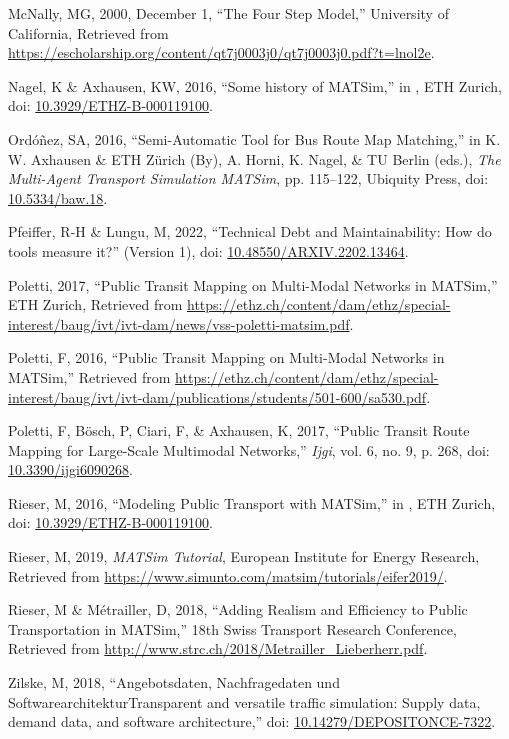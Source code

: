 \documentclass[11pt]{article}
\begin{document}
\begin{hangparas}{1.5em}{1}
\hypertarget{citeproc_bib_item_8}{McNally, MG, 2000, December 1, “The Four Step Model,” University of California, Retrieved from \url{https://escholarship.org/content/qt7j0003j0/qt7j0003j0.pdf?t=lnol2e}.}

\hypertarget{citeproc_bib_item_9}{Nagel, K \& Axhausen, KW, 2016, “Some history of MATSim,” in , ETH Zurich, doi: \href{https://doi.org/10.3929/ETHZ-B-000119100}{10.3929/ETHZ-B-000119100}.}

\hypertarget{citeproc_bib_item_10}{Ordóñez, SA, 2016, “Semi-Automatic Tool for Bus Route Map Matching,” in K. W. Axhausen \& ETH Zürich (By), A. Horni, K. Nagel, \& TU Berlin (eds.), \textit{The Multi-Agent Transport Simulation MATSim}, pp. 115–122, Ubiquity Press, doi: \href{https://doi.org/10.5334/baw.18}{10.5334/baw.18}.}

\hypertarget{citeproc_bib_item_11}{Pfeiffer, R-H \& Lungu, M, 2022, “Technical Debt and Maintainability: How do tools measure it?” (Version 1), doi: \href{https://doi.org/10.48550/ARXIV.2202.13464}{10.48550/ARXIV.2202.13464}.}

\hypertarget{citeproc_bib_item_12}{Poletti, 2017, “Public Transit Mapping on Multi-Modal Networks in MATSim,” ETH Zurich, Retrieved from \url{https://ethz.ch/content/dam/ethz/special-interest/baug/ivt/ivt-dam/news/vss-poletti-matsim.pdf}.}

\hypertarget{citeproc_bib_item_13}{Poletti, F, 2016, “Public Transit Mapping on Multi-Modal Networks in MATSim,” Retrieved from \url{https://ethz.ch/content/dam/ethz/special-interest/baug/ivt/ivt-dam/publications/students/501-600/sa530.pdf}.}

\hypertarget{citeproc_bib_item_14}{Poletti, F, Bösch, P, Ciari, F, \& Axhausen, K, 2017, “Public Transit Route Mapping for Large-Scale Multimodal Networks,” \textit{Ijgi}, vol. 6, no. 9, p. 268, doi: \href{https://doi.org/10.3390/ijgi6090268}{10.3390/ijgi6090268}.}

\hypertarget{citeproc_bib_item_15}{Rieser, M, 2016, “Modeling Public Transport with MATSim,” in , ETH Zurich, doi: \href{https://doi.org/10.3929/ETHZ-B-000119100}{10.3929/ETHZ-B-000119100}.}

\hypertarget{citeproc_bib_item_16}{Rieser, M, 2019, \textit{MATSim Tutorial}, European Institute for Energy Research, Retrieved from \url{https://www.simunto.com/matsim/tutorials/eifer2019/}.}

\hypertarget{citeproc_bib_item_17}{Rieser, M \& Métrailler, D, 2018, “Adding Realism and Efficiency to Public Transportation in MATSim,” 18th Swiss Transport Research Conference, Retrieved from \url{http://www.strc.ch/2018/Metrailler_Lieberherr.pdf}.}

\hypertarget{citeproc_bib_item_18}{Zilske, M, 2018, “Angebotsdaten, Nachfragedaten und SoftwarearchitekturTransparent and versatile traffic simulation: Supply data, demand data, and software architecture,” doi: \href{https://doi.org/10.14279/DEPOSITONCE-7322}{10.14279/DEPOSITONCE-7322}.}
\end{hangparas}
\pagebreak
\appendix
\end{document}
